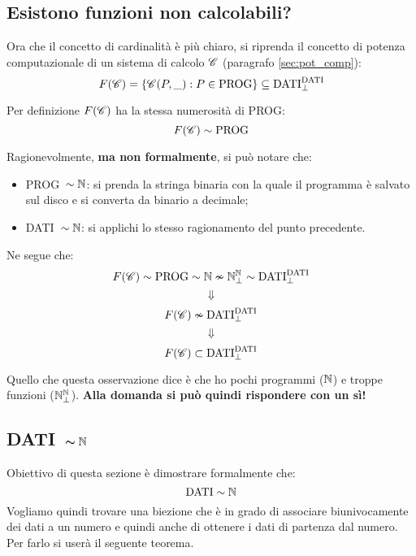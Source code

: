 \subsection{Esistono funzioni non calcolabili?}
Ora che il concetto di cardinalità è più chiaro, si riprenda il concetto di 
potenza computazionale di un sistema di calcolo $\mathscr{C}$ (paragrafo \ref{sec:pot_comp}):
$$
F(\mathscr{C}) = \{\mathscr{C}(P,\_):P\in\text{PROG}\} \subseteq \text{DATI}^{\text{DATI}}_\perp
$$

Per definizione $F(\mathscr{C})$ ha la stessa numerosità di PROG:
$$ F(\mathscr{C}) \sim \text{PROG} $$

Ragionevolmente, \textbf{ma non formalmente}, si può notare che:
\begin{itemize}
    \item PROG\ $\sim\mathbb{N}$: si prenda la stringa binaria con la quale il programma è
        salvato sul disco e si converta da binario a decimale;
    \item DATI\ $\sim\mathbb{N}$: si applichi lo stesso ragionamento del punto precedente.
\end{itemize}
Ne segue che:
$$ F(\mathscr{C}) \sim \text{PROG} \sim \mathbb{N} \nsim\mathbb{N}^{\mathbb{N}}_\perp\sim \text{DATI}^\text{DATI}_\perp$$
$$ \Downarrow $$
$$ F(\mathscr{C}) \nsim \text{DATI}^\text{DATI}_\perp $$
$$ \Downarrow $$
$$ F(\mathscr{C}) \subset \text{DATI}^\text{DATI}_\perp $$

Quello che questa osservazione dice è che ho pochi programmi ($\mathbb{N}$) e troppe
funzioni ($\mathbb{N}^{\mathbb{N}}_\perp$).
\textbf{Alla domanda  si può quindi 
rispondere con un sì!}

\subsection{\texorpdfstring{DATI\ $\bm{\sim\mathbb{N}}$}{DATI~N}}
Obiettivo di questa sezione è dimostrare formalmente che:
$$ \text{DATI} \sim \mathbb{N} $$
Vogliamo quindi trovare una biezione che è in grado di associare biunivocamente
dei dati a un numero e quindi anche di ottenere i dati di partenza dal
numero. Per farlo si userà il seguente teorema.

